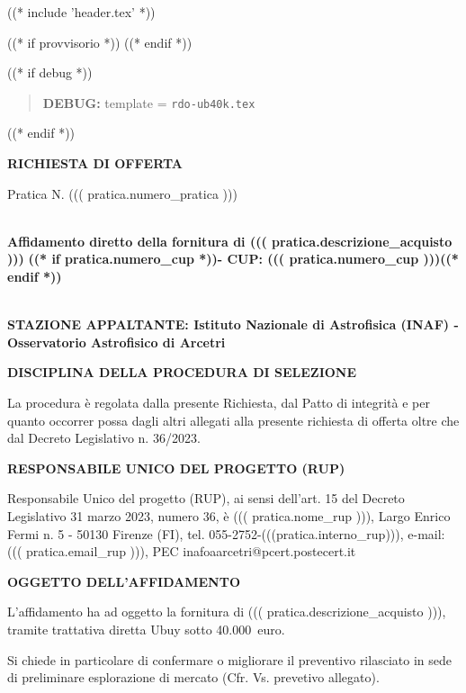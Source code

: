 
((* include 'header.tex' *))

((* if provvisorio *))
((* endif *))



\topaddr

((* if debug *))
\begin{quotation}
	\textbf{DEBUG:} template = \texttt{rdo-ub40k.tex}
\end{quotation}
((* endif *))

\begin{center}
\textbf{RICHIESTA DI OFFERTA}
\end{center}

Pratica N. ((( pratica.numero_pratica )))


~\\
\textbf{Affidamento diretto della fornitura di ((( pratica.descrizione_acquisto )))}
\textbf{((* if pratica.numero_cup *))- CUP: ((( pratica.numero_cup )))((* endif *))}


~\\
\textbf{STAZIONE APPALTANTE: Istituto Nazionale di Astrofisica (INAF) - Osservatorio Astrofisico di Arcetri}

\textbf{DISCIPLINA DELLA PROCEDURA DI SELEZIONE}

La procedura è regolata dalla presente Richiesta, dal Patto di integrità
e per quanto occorrer possa dagli altri allegati alla presente richiesta
di offerta oltre che dal Decreto Legislativo n. 36/2023.


\textbf{RESPONSABILE UNICO DEL PROGETTO (RUP)}

Responsabile Unico del progetto (RUP), ai sensi dell'art. 15 del
Decreto Legislativo 31 marzo 2023, numero 36, è
 ((( pratica.nome_rup ))), Largo Enrico Fermi n. 5 - 50130 Firenze
 (FI), tel. 055-2752-(((pratica.interno_rup))),
e-mail: ((( pratica.email_rup ))), PEC inafoaarcetri@pcert.postecert.it


\textbf{OGGETTO DELL'AFFIDAMENTO}

L'affidamento ha ad oggetto la fornitura di  ((( pratica.descrizione_acquisto ))),
tramite trattativa diretta Ubuy sotto 40.000~euro.


Si chiede in particolare di confermare o migliorare il preventivo
rilasciato in sede di preliminare esplorazione di mercato (Cfr. Vs. prevetivo allegato).


